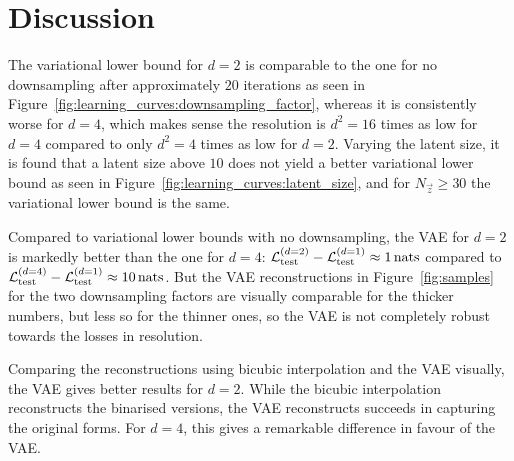 \section{Discussion}
\label{sec:discussion}

The variational lower bound for $d = 2$ is comparable to the one for no downsampling after approximately $20$ iterations as seen in Figure~\ref{fig:learning_curves:downsampling_factor}, whereas it is consistently worse for $d = 4$, which makes sense the resolution is $d^2 = 16$ times as low for $d = 4$ compared to only $d^2 = 4$ times as low for $d = 2$.
Varying the latent size, it is found that a latent size above $10$ does not yield a better variational lower bound as seen in Figure~\ref{fig:learning_curves:latent_size}, and for $N_{\vec{z}} \geq 30$ the variational lower bound is the same.

Compared to variational lower bounds with no downsampling, the VAE for $d = 2$ is markedly better than the one for $d = 4$: $\mathcal{L}_{\text{test}}^{(d = 2)} - \mathcal{L}_{\text{test}}^{(d = 1)} \approx \SI{1}{nats}$ compared to $\mathcal{L}_{\text{test}}^{(d = 4)} - \mathcal{L}_{\text{test}}^{(d = 1)} \approx \SI{10}{nats}$.
But the VAE reconstructions in Figure~\ref{fig:samples} for the two downsampling factors are visually comparable for the thicker numbers, but less so for the thinner ones, so the VAE is not completely robust towards the losses in resolution.

Comparing the reconstructions using bicubic interpolation and the VAE visually, the VAE gives better results for $d = 2$.
While the bicubic interpolation reconstructs the binarised versions, the VAE reconstructs succeeds in capturing the original forms.
For $d = 4$, this gives a remarkable difference in favour of the VAE.
